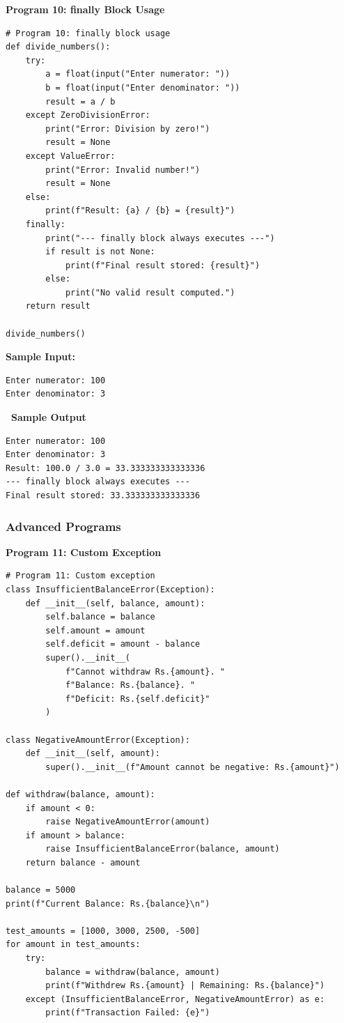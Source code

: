 \documentclass[12pt,a4paper]{article}
\newcommand{\outhead}{\noindent\colorbox{cmrgreen!25}%
  {\textbf{\small\color{cmrdark}~Sample Output~}}\par\vspace{-1pt}}
\begin{document}
\textbf{Program 10: finally Block Usage}

\begin{lstlisting}
# Program 10: finally block usage
def divide_numbers():
    try:
        a = float(input("Enter numerator: "))
        b = float(input("Enter denominator: "))
        result = a / b
    except ZeroDivisionError:
        print("Error: Division by zero!")
        result = None
    except ValueError:
        print("Error: Invalid number!")
        result = None
    else:
        print(f"Result: {a} / {b} = {result}")
    finally:
        print("--- finally block always executes ---")
        if result is not None:
            print(f"Final result stored: {result}")
        else:
            print("No valid result computed.")
    return result

divide_numbers()
\end{lstlisting}

\textbf{Sample Input:}
\begin{verbatim}
Enter numerator: 100
Enter denominator: 3
\end{verbatim}

\outhead
\begin{lstlisting}[style=outputstyle]
Enter numerator: 100
Enter denominator: 3
Result: 100.0 / 3.0 = 33.333333333333336
--- finally block always executes ---
Final result stored: 33.333333333333336
\end{lstlisting}

\subsubsection{Advanced Programs}

\textbf{Program 11: Custom Exception}

\begin{lstlisting}
# Program 11: Custom exception
class InsufficientBalanceError(Exception):
    def __init__(self, balance, amount):
        self.balance = balance
        self.amount = amount
        self.deficit = amount - balance
        super().__init__(
            f"Cannot withdraw Rs.{amount}. "
            f"Balance: Rs.{balance}. "
            f"Deficit: Rs.{self.deficit}"
        )

class NegativeAmountError(Exception):
    def __init__(self, amount):
        super().__init__(f"Amount cannot be negative: Rs.{amount}")

def withdraw(balance, amount):
    if amount < 0:
        raise NegativeAmountError(amount)
    if amount > balance:
        raise InsufficientBalanceError(balance, amount)
    return balance - amount

balance = 5000
print(f"Current Balance: Rs.{balance}\n")

test_amounts = [1000, 3000, 2500, -500]
for amount in test_amounts:
    try:
        balance = withdraw(balance, amount)
        print(f"Withdrew Rs.{amount} | Remaining: Rs.{balance}")
    except (InsufficientBalanceError, NegativeAmountError) as e:
        print(f"Transaction Failed: {e}")
\end{lstlisting}
\end{document}
